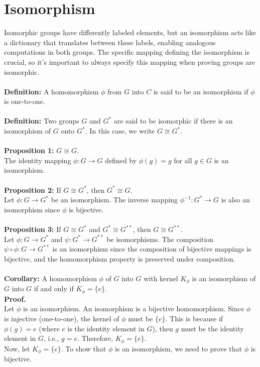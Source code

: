 \section{Isomorphism}
Isomorphic groups have differently labeled elements, but an isomorphism acts like a dictionary that translates between these labels, enabling analogous computations in both groups. The specific mapping defining the isomorphism is crucial, so it's important to always specify this mapping when proving groups are isomorphic.
\\\\
\textbf{Definition:} A homomorphism \( \phi \) from \( G \) into \( C \) is said to be an isomorphism if \( \phi \) is one-to-one.
\\\\
\textbf{Definition:} Two groups \( G \) and \( G^* \) are said to be isomorphic if there is an isomorphism of \( G \) onto \( G^* \). In this case, we write \( G \cong G^* \).
\\\\
\textbf{Proposition 1:} \( G \cong G \).\\
The identity mapping \( \phi: G \to G \) defined by \( \phi(g) = g \) for all \( g \in G \) is an isomorphism.
\\\\
\textbf{Proposition 2:} If \( G \cong G^* \), then \( G^* \cong G \).
\\
Let \( \phi: G \to G^* \) be an isomorphism. The inverse mapping \( \phi^{-1}: G^* \to G \) is also an isomorphism since \( \phi \) is bijective.
\\\\
\textbf{Proposition 3:} If \( G \cong G^* \) and \( G^* \cong G^{**} \), then \( G \cong G^{**} \).
\\
Let \( \phi: G \to G^* \) and \( \psi: G^* \to G^{**} \) be isomorphisms. The composition \( \psi \circ \phi: G \to G^{**} \) is an isomorphism since the composition of bijective mappings is bijective, and the homomorphism property is preserved under composition.
\\\\
\textbf{Corollary:} A homomorphism \( \phi \) of \( G \) into \( G \) with kernel \( K_\phi \) is an isomorphism of \( G \) into \( G \) if and only if \( K_\phi = \{e\} \).
\\
\textbf{Proof.}
\\
Let \( \phi \) is an isomorphism. An isomorphism is a bijective homomorphism. Since \( \phi \) is injective (one-to-one), the kernel of \( \phi \) must be \( \{e\} \). This is because if \( \phi(g) = e \) (where \( e \) is the identity element in \( G \)), then \( g \) must be the identity element in \( G \), i.e., \( g = e \). Therefore, \( K_\phi = \{e\} \).
\\
Now, let \( K_\phi = \{e\} \). To show that \( \phi \) is an isomorphism, we need to prove that \( \phi \) is bijective.

